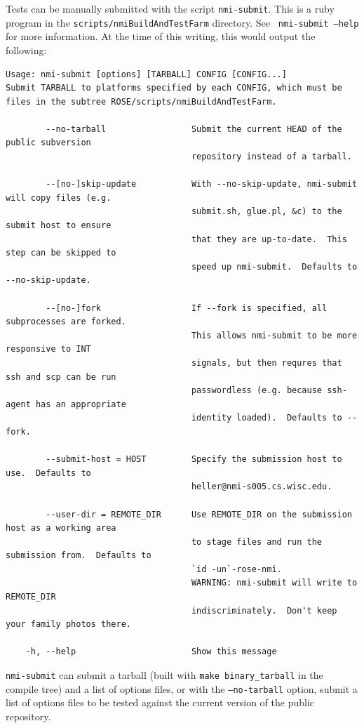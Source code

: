 Tests can be manually submitted with the script {\tt nmi-submit}.  This is a
ruby program in the {\tt scripts/nmiBuildAndTestFarm} directory.  See {\tt
nmi-submit --help} for more information.  At the time of this writing, this
would output the following:

\begin{verbatim}
Usage: nmi-submit [options] [TARBALL] CONFIG [CONFIG...]
Submit TARBALL to platforms specified by each CONFIG, which must be
files in the subtree ROSE/scripts/nmiBuildAndTestFarm.

        --no-tarball                 Submit the current HEAD of the public subversion
                                     repository instead of a tarball.

        --[no-]skip-update           With --no-skip-update, nmi-submit will copy files (e.g.
                                     submit.sh, glue.pl, &c) to the submit host to ensure
                                     that they are up-to-date.  This step can be skipped to
                                     speed up nmi-submit.  Defaults to --no-skip-update.

        --[no-]fork                  If --fork is specified, all subprocesses are forked.
                                     This allows nmi-submit to be more responsive to INT
                                     signals, but then requres that ssh and scp can be run
                                     passwordless (e.g. because ssh-agent has an appropriate
                                     identity loaded).  Defaults to --fork.

        --submit-host = HOST         Specify the submission host to use.  Defaults to
                                     heller@nmi-s005.cs.wisc.edu.

        --user-dir = REMOTE_DIR      Use REMOTE_DIR on the submission host as a working area
                                     to stage files and run the submission from.  Defaults to
                                     `id -un`-rose-nmi.
                                     WARNING: nmi-submit will write to REMOTE_DIR
                                     indiscriminately.  Don't keep your family photos there.

    -h, --help                       Show this message
\end{verbatim}

{\tt nmi-submit} can submit a tarball (built with {\tt make
binary\_tarball} in the compile tree) and a list of options files, or with the
{\tt --no-tarball} option, submit a list of options files to be tested against
the current version of the public repository.

